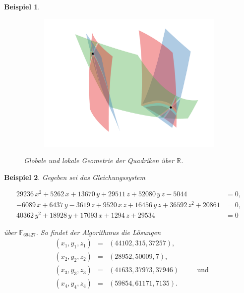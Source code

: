 \documentclass[a4paper,oneside, 11pt, openany%
]{article}
\newcommand{\R}{{\mathbb R}}
\newcommand{\F}[1]{\mathbb{F}_{#1}}
\theoremstyle{custom}
\theoremstyle{custom}
\newtheorem{example}{Beispiel}[section]
\begin{document}
\begin{example}
\begin{figure}[H]
\begin{subfigure}[b]{0.8\textwidth}
				\includegraphics[width=\textwidth]{"images/e3q3_example2_zoom.png"}
			\end{subfigure}
			\caption{Globale und lokale Geometrie der Quadriken über $\R$.}
		\end{figure}
	\end{example}
	\newpage
		\begin{example}
		Gegeben sei das Gleichungssystem

			\begin{equation*}
				\begin{alignedat}{-1}
					29236\,x^2+5262\,x+13670\,y+29511\,z+52080\,y\,z-5044&=0,\\ -6089\,x+6437\,y-3619\,z+9520\,x\,z+16456\,y\,z+36592\,z^2+20861&=0,\\ 40362\,y^2+18928\,y+17093\,x+1294\,z+29534&=0
				\end{alignedat}
			\end{equation*}

		über $\F{69427}$.
		So findet der Algorithmus  die Lösungen
		\begin{equation*}\label{eqn:example4}
			\begin{alignedat}{5}
				&\left( x_{1},y_{1},z_{1}\right) &=& \left(44102,315,37257 \right),&& \\
				&\left( x_{2},y_{2},z_{2}\right) &=& \left(28952,50009,7 \right),&& \\
				&\left( x_{3},y_{3},z_{3}\right) &=& \left(41633,37973,37946 \right)&& \quad\text{und} \\
				&\left( x_{4},y_{4},z_{4}\right) &=& \left(59854,61171,7135 \right).&&
			\end{alignedat}
		\end{equation*}
	\end{example}
\end{document}
